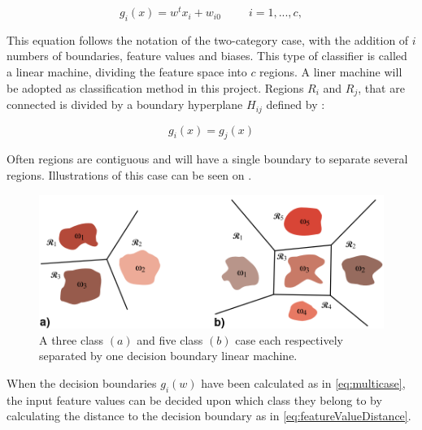 \begin{equation} \label{eq:multicase}
g_{i}(x) = w^tx_{i} +w_{i0} ~~~~~~~~~~~ i = 1,...,c,
\end{equation}

This equation follows the notation of the two-category case, with the addition of $i$ numbers of boundaries, feature values and biases. This type of classifier is called a linear machine, dividing the feature space into $c$ regions. A liner machine will be adopted as classification method in this project. Regions $R_i$ and $R_j$, that are connected is divided by a boundary hyperplane $H_{ij}$ defined by \cite{Duda2000}:

\begin{equation}
g_i(x) = g_j(x)
\end{equation}

Often regions are contiguous and will have a single boundary to separate several regions. \cite{Duda2000} Illustrations of this case can be seen on . 

\begin{figure}[H]                 
	\includegraphics[width=.6\textwidth]{figures/xBackground/LMregions}  
	\caption{A three class $(a)$ and five class $(b)$ case each respectively separated by one decision boundary linear machine. \cite{Duda2000}}
	\label{fig:LMregions} 
\end{figure}

When the decision boundaries $g_i(w)$ have been calculated as in \eqref{eq:multicase}, the input feature values can be decided upon which class they belong to by calculating the distance to the decision boundary as in \eqref{eq:featureValueDistance}. 




